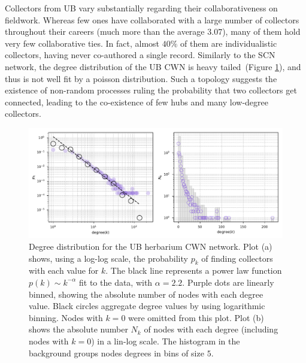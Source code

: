 Collectors from UB vary substantially regarding their collaborativeness on fieldwork.
Whereas few ones have collaborated with a large number of collectors throughout their careers (much more than the average $3.07$), many of them hold very few collaborative ties.
In fact, almost $40\%$ of them are individualistic collectors, having never co-authored a single record.
%
Similarly to the SCN network, the degree distribution of the UB CWN is heavy tailed~(Figure \ref{fig:ub_cwn_degree_dist}), and thus is not well fit by a poisson distribution.
Such a topology suggests the existence of non-random processes ruling the probability that two collectors get connected, leading to the co-existence of few hubs and many low-degree collectors.
\begin{figure}[!ht]
  	\centering
    \includegraphics[width=\linewidth]{figures/casestudy_ub/cwn_degree_dist.pdf}
    \caption[Degree distribution for the UB CWN.]{ Degree distribution for the UB herbarium CWN network. Plot (a) shows, using a log-log scale, the probability $p_k$ of finding collectors with each value for $k$. The black line represents a power law function $p(k) \sim k^{-\alpha}$ fit to the data, with $\alpha=2.2$. Purple dots are linearly binned, showing the absolute number of nodes with each degree value. Black circles aggregate degree values by using logarithmic binning. Nodes with $k=0$ were omitted from this plot. Plot (b) shows the absolute number $N_k$ of nodes with each degree (including nodes with $k=0$) in a lin-log scale. The histogram in the background groups nodes degrees in bins of size $5$. }
    \label{fig:ub_cwn_degree_dist}
\end{figure}

